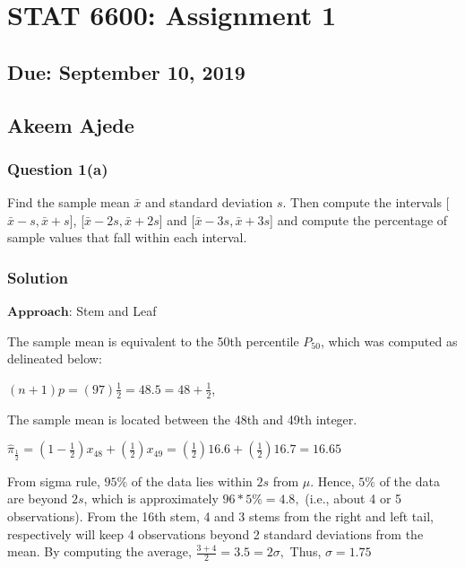 \documentclass[]{article}
\title{}
\author{}
\date{}
\begin{document}
\hypertarget{stat-6600-assignment-1}{%
\section{STAT 6600: Assignment 1}\label{stat-6600-assignment-1}}

\hypertarget{due-september-10-2019}{%
\subsection{Due: September 10, 2019}\label{due-september-10-2019}}

\hypertarget{akeem-ajede}{%
\subsection{Akeem Ajede}\label{akeem-ajede}}

\medskip

\hypertarget{question-1a}{%
\subsubsection{Question 1(a)}\label{question-1a}}

Find the sample mean \(\bar{x}\) and standard deviation \(s\). Then
compute the intervals {[}\(\bar{x}-s, \bar{x}+s\){]},
{[}\(\bar{x}-2s, \bar{x}+2s\){]} and {[}\(\bar{x}-3s, \bar{x}+3s\){]}
and compute the percentage of sample values that fall within each
interval.

\hypertarget{solution}{%
\subsubsection{Solution}\label{solution}}

\(\mathbf{Approach}\): Stem and Leaf

The sample mean is equivalent to the 50th percentile \(P_{50}\), which
was computed as delineated below:

\((n+1)p=(97)\frac{1}{2}=48.5 = 48+\frac{1}{2}\),

The sample mean is located between the 48th and 49th integer.

\(\hat{\pi}_{\frac{1}{2}}=(1-\frac{1}{2})x_{48}+(\frac{1}{2})x_{49}=(\frac{1}{2})16.6+(\frac{1}{2})16.7=16.65\)

From sigma rule, \(95\%\) of the data lies within \(2s\) from \(\mu\).
Hence, \(5\%\) of the data are beyond \(2s\), which is approximately
\(96*5\%=4.8,\) (i.e., about 4 or 5 observations). From the 16th stem, 4
and 3 stems from the right and left tail, respectively will keep 4
observations beyond 2 standard deviations from the mean. By computing
the average, \(\frac{3+4}{2}=3.5=2\sigma,\) Thus, \(\sigma=1.75\)
\end{document}
